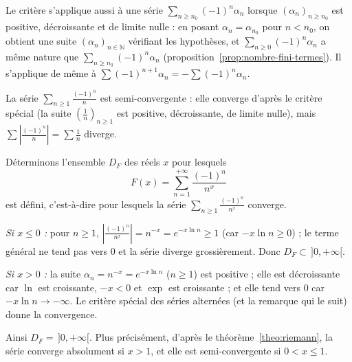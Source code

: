 \begin{remarque}
Le critère s'applique aussi à une série $\sum_{n\geq n_0}(-1)^n\alpha_n$ lorsque $(\alpha_n)_{n\geq n_0}$ est positive, décroissante et de limite nulle : en posant $\alpha_n=\alpha_{n_0}$ pour $n<n_0$, on obtient une suite $(\alpha_n)_{n\in\mathbb{N}}$ vérifiant les hypothèses, et $\sum_{n\geq0}(-1)^n\alpha_n$ a même nature que $\sum_{n\geq n_0}(-1)^n\alpha_n$ (proposition~\ref{prop:nombre-fini-termes}). Il s'applique de même à $\sum(-1)^{n+1}\alpha_n=-\sum(-1)^n\alpha_n$.
\end{remarque}

\begin{exemple}
La série $\sum_{n\geq1}\frac{(-1)^n}{n}$ est semi-convergente : elle converge d'après le critère spécial (la suite $(\frac1n)_{n\geq1}$ est positive, décroissante, de limite nulle), mais $\sum\left|\frac{(-1)^n}{n}\right|=\sum\frac1n$ diverge.
\end{exemple}

\begin{exemple}
\label{ex:domaine-F}
Déterminons l'ensemble $D_F$ des réels $x$ pour lesquels
\[F(x)=\sum_{n=1}^{+\infty}\frac{(-1)^n}{n^x}\]
est défini, c'est-à-dire pour lesquels la série $\sum_{n\geq1}\frac{(-1)^n}{n^x}$ converge.

\emph{Si $x\leq 0$ :} pour $n\geq 1$, $\left|\frac{(-1)^n}{n^x}\right|=n^{-x}=e^{-x\ln n}\geq 1$ (car $-x\ln n\geq 0$) ; le terme général ne tend pas vers $0$ et la série diverge grossièrement. Donc $D_F\subset\,]0,+\infty[$.

\emph{Si $x>0$ :} la suite $\alpha_n=n^{-x}=e^{-x\ln n}$ ($n\geq1$) est positive ; elle est décroissante car $\ln$ est croissante, $-x<0$ et $\exp$ est croissante ; et elle tend vers $0$ car $-x\ln n\to-\infty$. Le critère spécial des séries alternées (et la remarque qui le suit) donne la convergence.

Ainsi $D_F=\,]0,+\infty[$. Plus précisément, d'après le théorème~\ref{theo:riemann}, la série converge absolument si $x>1$, et elle est semi-convergente si $0<x\leq 1$.
\end{exemple}
